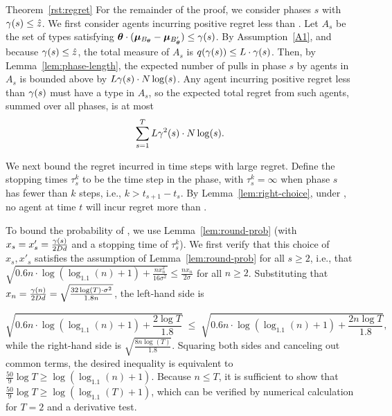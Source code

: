 \begin{emptyextraproof}{Theorem~\ref{rst:regret}}
For the remainder of the proof, we consider phases $s$
with $\EarlyCut{s} \leq \TieCutoff$.
We first consider agents \AgV incurring positive regret less than .
Let $A_s$ be the set of types satisfying 
$\AgV \cdot (\ArmV{\Best{\AgV}} - \ArmV{\Second{\AgV}}) \leq \EarlyCut{s}$.
By Assumption~\ref{A1}, and because $\EarlyCut{s} \leq \TieCutoff$,
the total measure of $A_s$
is $\AlmostTied{\EarlyCut{s}} \leq \TieDensity \cdot \EarlyCut{s}$.
Then, by Lemma~\ref{lem:phase-length},
the expected number of pulls in phase $s$ by agents in $A_s$  
is bounded above by $\TieDensity \EarlyCut{s} \cdot \ARMNUM \log(s)$.
Any agent \AgV incurring positive regret less than $\EarlyCut{s}$
must have a type in $A_s$,
so the expected total regret from such agents,
summed over all phases, is at most
\begin{equation}
\sum_{s=1}^{T} \TieDensity \EarlyCut[2]{s} \cdot \ARMNUM \log(s).
\label{equ:small_regret_bound}
\end{equation}


We next bound the regret incurred in time steps with large regret.
Define the stopping times $\tau_{s}^{k}$ to be the 
time step in the  phase,
with $\tau_{s}^{k} = \infty$ when phase $s$ has fewer than $k$ steps,
i.e., $k > t_{s+1}-t_{s}$.
By Lemma~\ref{lem:right-choice},
under , no agent at time $t$ will incur
regret more than .
  
To bound the probability of ,
we use Lemma~\ref{lem:round-prob}
(with $x_s = x'_s = \frac{\EarlyCut{s}}{2 \Diam d}$
and a stopping time of $\tau_s^k$).
We first verify that this choice of $x_s, x'_s$
satisfies the assumption of Lemma~\ref{lem:round-prob} for all
$s \geq 2$,
i.e., that
$\sqrt{0.6 n \cdot \log (\log_{1.1}(n) + 1) + \frac{n x_n^2}{16 \sigma^2}}
\leq \frac{n x_n}{2 \sigma}$
for all $n \geq 2$.
Substituting that
$x_n = \frac{\EarlyCut{n}}{2 \Diam d} = \sqrt{\frac{32\log(T) \cdot \sigma^2}{1.8 n}}$,
the left-hand side is

\[
  \sqrt{0.6 n \cdot \log (\log_{1.1}(n) + 1) + \frac{2 \log T}{1.8}}
  \; \leq \;
  \sqrt{0.6 n \cdot \log (\log_{1.1}(n) + 1) + \frac{2 n \log T}{1.8}},
\]
while the right-hand side is $\sqrt{\frac{8 n \log(T)}{1.8}}$.
Squaring both sides and canceling out common terms,
the desired inequality is equivalent to
$\frac{50}{9} \log T \geq \log(\log_{1.1}(n) + 1)$.
Because $n \leq T$, it is sufficient to show that
$\frac{50}{9} \log T \geq \log(\log_{1.1}(T) + 1)$,
which can be verified by numerical calculation for $T=2$ and a
derivative test.


\end{emptyextraproof}
